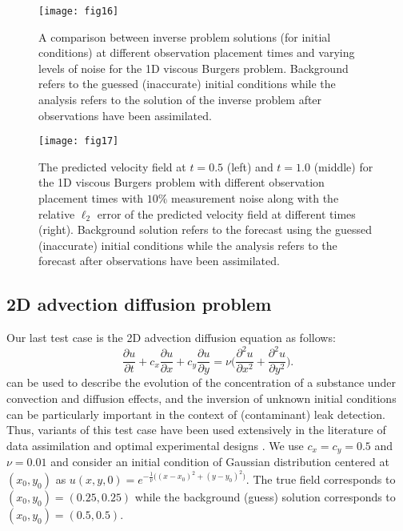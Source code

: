 \documentclass{article}
\begin{document}
\begin{figure}[ht!]
    \centering
    \texttt{[image: fig16]}
    \caption{\textcolor{rev2}{A comparison between inverse problem solutions (for initial conditions) at different observation placement times and varying levels of noise for the 1D viscous Burgers problem. Background refers to the guessed (inaccurate) initial conditions while the analysis refers to the solution of the inverse problem after observations have been assimilated.}}
    \label{fig:brg_ic}
\end{figure}


\begin{figure}[ht!]
    \centering
    \texttt{[image: fig17]}
    \caption{\textcolor{rev2}{The predicted velocity field at $t=0.5$ (left) and $t=1.0$ (middle) for the 1D viscous Burgers problem with different observation placement times with $10\%$ measurement noise along with the relative $\ell_2$ error of the predicted velocity field at different times (right). Background solution refers to the forecast using the guessed (inaccurate) initial conditions while the analysis refers to the forecast after observations have been assimilated.}}
    \label{fig:brg_pred}
\end{figure}


\subsection{2D advection diffusion problem}
\textcolor{rev}{Our last test case is the 2D advection diffusion equation as follows:
\begin{equation}
    \dfrac{\partial u}{\partial t} + c_x \dfrac{\partial u}{\partial x} + c_y \dfrac{\partial u}{\partial y} = \nu \Big(\dfrac{\partial^2 u}{\partial x^2}+\dfrac{\partial^2 u}{\partial y^2}\Big). \label{eq:ad}
\end{equation}
 can be used to describe the evolution of the concentration of a substance under convection and diffusion effects, and the inversion of unknown initial conditions can be particularly important in the context of (contaminant) leak detection. Thus, variants of this test case have been used extensively in the literature of data assimilation and optimal experimental designs \cite{petra2011model,attia2022stochastic,attia2023pyoed}. We use $c_x=c_y = 0.5$ and $\nu = 0.01$ and consider an initial condition of Gaussian distribution centered at $(x_0,y_0)$ as $u(x,y,0)=e^{-\frac{1}{\nu}\big((x-x_0)^2 + (y-y_0)^2\big)}$. The true field corresponds to $(x_0,y_0)=(0.25,0.25)$ while the background (guess) solution corresponds to $(x_0,y_0)=(0.5,0.5)$.}
\end{document}
